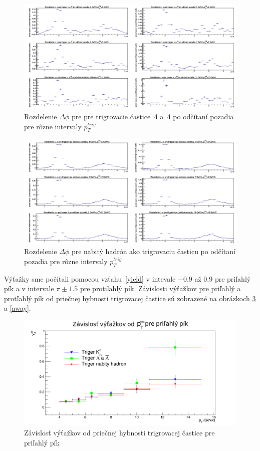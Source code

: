 \documentclass[thesismargins, thesislinespacing]{rnthesis}
\begin{document}
\begin{figure}[hbtp!]
	\centering
	\includegraphics[width=\textwidth]{./Obrazky_praca/DeltaPhiLH.png}
	\caption{Rozdelenie $\Delta \phi$ pre pre trigrovacie častice $\Lambda$ a $\bar{\Lambda}$  po odčítaní pozadia pre rôzne intervaly $p_T^{trig}$}
	\label{lambda}
\end{figure}

\begin{figure}[hbtp!]
	\centering
	\includegraphics[width=\textwidth]{./Obrazky_praca/DeltaPhiHH.png}
	\caption{Rozdelenie $\Delta \phi$ pre nabitý hadrón ako trigrovaciu časticu po odčítaní pozadia pre rôzne intervaly $p_T^{trig}$}
	\label{hh}
\end{figure}
\newpage

Výťažky sme počítali pomocou vzťahu~\ref{yield} v intevale $-0.9$ až 0.9 pre priľahlý pík a v intervale $\pi\pm1.5$ pre protiľahlý pík. Závislosti výťažkov pre priľahlý a protľahlý pík od priečnej hybnosti trigrovacej častice sú zobrazené na obrázkoch \ref{near} a \ref{away}.

\begin{figure}[hbtp!]
	\centering
	\includegraphics[width=\textwidth]{./Obrazky_praca/vytazok_near.png}
	\caption{Závislosť výťažkov od priečnej hybnosti trigrovacej častice pre priľahlý pík}
	\label{near}
\end{figure}
\end{document}
